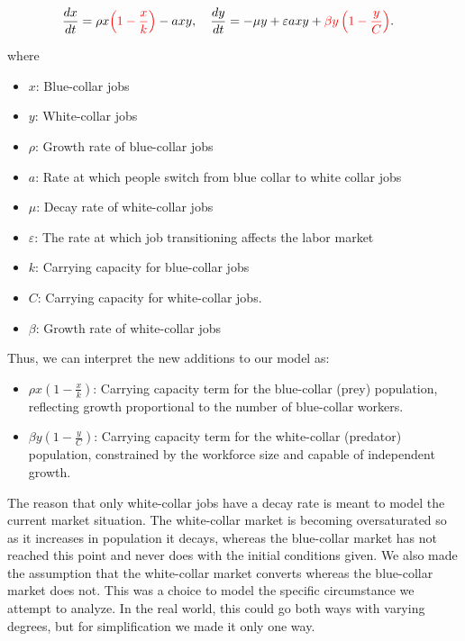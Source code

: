 \documentclass[11pt]{amsart}
\begin{document}
\begin{align}
    \frac{dx}{dt} &= \rho x {\color{red}\left(1-\frac{x}{k}\right)} - a x y, \quad \frac{dy}{dt} = -\mu y + \varepsilon a x y + {\color{red} \beta y \left(1-\frac{y}{C}\right)}.
\end{align}

where 

\begin{itemize}
    \item $x$: Blue-collar jobs
    \item $y$: White-collar jobs
    \item $\rho$: Growth rate of blue-collar jobs
    \item $a$: Rate at which people switch from blue collar to white collar jobs
    \item $\mu$: Decay rate of white-collar jobs
    \item $\varepsilon$: The rate at which job transitioning affects the labor market
    \item $k$: Carrying capacity for blue-collar jobs
    \item $C$: Carrying capacity for white-collar jobs.
    \item $\beta$: Growth rate of white-collar jobs
\end{itemize}

Thus, we can interpret the new additions to our model as:

\begin{itemize}
    \item $\rho x (1-\frac{x}{k})$: Carrying capacity term for the blue-collar (prey) population, reflecting growth proportional to the number of blue-collar workers.
    \item $\beta y (1-\frac{y}{C})$: Carrying capacity term for the white-collar (predator) population, constrained by the workforce size and capable of independent growth.
\end{itemize}


The reason that only white-collar jobs have a decay rate is meant to model the current market situation. The white-collar market is becoming
oversaturated so as it increases in population it decays, whereas the blue-collar market has not reached this point and never does with the initial conditions given.
We also made the assumption that the white-collar market converts whereas the blue-collar market does not. This was a choice to model the specific
circumstance we attempt to analyze. In the real world, this could go both ways with varying degrees, but for simplification we made it only one way.
\end{document}
